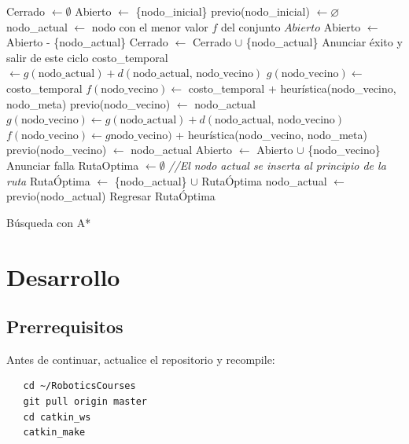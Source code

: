 \documentclass[letterpaper,12pt]{article}
\begin{document}
\begin{algorithm}
\DontPrintSemicolon
{}
Cerrado $\leftarrow \emptyset$\;
Abierto $\leftarrow$ \{nodo\_inicial\}\;
previo(nodo\_inicial) $\leftarrow \varnothing$\;
{
  nodo\_actual $\leftarrow$ nodo con el menor valor $f$ del conjunto $Abierto$\;
  Abierto $\leftarrow$ Abierto - \{nodo\_actual\}\;
  Cerrado $\leftarrow$ Cerrado $\cup$ \{nodo\_actual\}\;
  {
    Anunciar éxito y salir de este ciclo\;
  }
  {
    {
      costo\_temporal $\leftarrow g(\textrm{nodo\_actual}) + d(\textrm{nodo\_actual, nodo\_vecino})$\;
      {
        $g(\textrm{nodo\_vecino})\leftarrow$ costo\_temporal\;
        $f(\textrm{nodo\_vecino})\leftarrow$ costo\_temporal + heurística(nodo\_vecino, nodo\_meta)\;
        previo(nodo\_vecino) $\leftarrow$ nodo\_actual\;
      }
    }
    {
      $g(\textrm{nodo\_vecino})\leftarrow g(\textrm{nodo\_actual}) + d(\textrm{nodo\_actual, nodo\_vecino})$\;
      $f(\textrm{nodo\_vecino})\leftarrow g\textrm{nodo\_vecino})$  + heurística(nodo\_vecino, nodo\_meta)\;
      previo(nodo\_vecino) $\leftarrow$ nodo\_actual\;
      Abierto $\leftarrow$ Abierto $\cup$ \{nodo\_vecino\}\; 
    }
  }
}
{
  Anunciar falla\;
}
{
  RutaOptima $\leftarrow\emptyset$ \;
  {
    \textit{//El nodo actual se inserta al principio de la ruta}\;
    RutaÓptima $\leftarrow$ \{nodo\_actual\} $\cup$ RutaÓptima \;
    nodo\_actual $\leftarrow$ previo(nodo\_actual)\;
  }
  Regresar RutaÓptima
}
\caption{Búsqueda con A*}
\label{alg:AStar}
\end{algorithm}

\section{Desarrollo}

\subsection{Prerrequisitos}
Antes de continuar, actualice el repositorio y recompile:
\begin{verbatim}
   cd ~/RoboticsCourses
   git pull origin master
   cd catkin_ws
   catkin_make
\end{verbatim}
\end{document}

